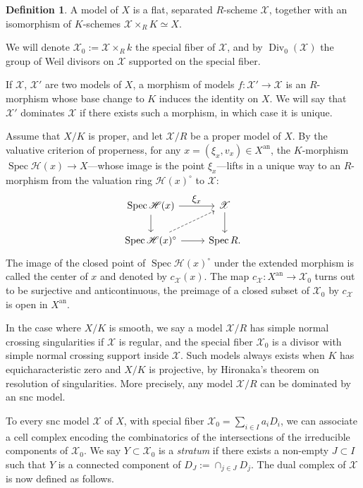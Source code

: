 \documentclass[JEP,XML,SOM,Unicode,published]{cedram}
\let\ts\textstyle
\theoremstyle{definition}
\newtheorem{defn}[equation]{Definition}
\newcommand \X {\mathscr{X}}
\newcommand{\an}{\mathrm{an}}
\DeclareMathOperator \Div {Div}
\DeclareMathOperator{\Sp}{Spec}
\begin{document}
\begin{defn} A model of $X$ is a flat, separated $R$-scheme $\X$, together with an isomorphism of $K$-schemes $\X \times_{R} K \simeq X$.

We will denote $\X_0:= \X \times_{R} k$ the special fiber of $\X$, and by $\Div_0(\X)$ the group of Weil divisors on $\X$ supported on the special fiber.
\end{defn}
If $\X$, $\X'$ are two models of $X$, a morphism of models $f: \X' \to \X$ is an $R$-morphism whose base change to $K$ induces the identity on $X$. We will say that $\X'$ dominates $\X$ if there exists such a morphism, in which case it is unique.

Assume that $X/K$ is proper, and let $\X/R$ be a proper model of $X$. By the valuative criterion of properness, for any $x =(\xi_x,v_x) \in X^{\an}$, the $K$-morphism \hbox{$\Sp \mathscr{H}(x) \to X$}---whose image is the point $\xi_x$---lifts in a unique way to an $R$\nobreakdash-mor\-phism from the valuation ring $\mathscr{H}(x)^{\circ}$ to $\X$:
\[
\begin{tikzcd}
\Sp \mathscr{H}(x) \arrow[r, "\ts\xi_x"] \arrow[d] & \X \arrow[d] \\
\Sp \mathscr{H}(x)^{\circ} \arrow[ru, dashed] \arrow[r] & \Sp R.
\end{tikzcd}
\]
The image of the closed point of $\Sp \mathscr{H}(x)^{\circ}$ under the extended morphism is called the center of $x$ and denoted by $c_\X(x)$. The map $c_{\X}: X^{\an} \to \X_0$ turns out to be surjective and anticontinuous, \ie the preimage of a closed subset of $\X_0$ by $c_{\X}$ is open in $X^{\an}$.

In the case where $X/K$ is smooth, we say a model $\X/R$ has simple normal crossing singularities if $\X$ is regular, and the special fiber $\X_0$ is a divisor with simple normal crossing support inside $\X$. Such models always exists when $K$ has equicharacteristic zero and $X/K$ is projective, by Hironaka's theorem on resolution of singularities. More precisely, any model $\X/R$ can be dominated by an snc model.

To every snc model $\X$ of $X$, with special fiber $\X_0 = \sum_{i \in I} a_i D_i$, we can associate a cell complex encoding the combinatorics of the intersections of the irreducible components of $\X_0$. We say $Y \subset \X_0$ is a \emph{stratum} if there exists a non-empty $J \subset I$ such that $Y$ is a connected component of $D_J:= \cap_{j \in J} D_j$. The dual complex of $\X$ is now defined as follows.
\end{document}
